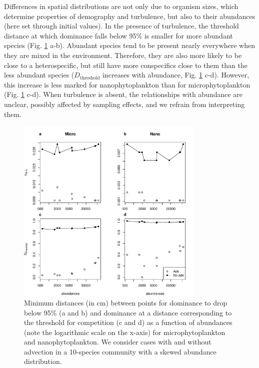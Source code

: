 \documentclass[english]{article}
\begin{document}
Differences in spatial distributions are not only due to organism
sizes, which determine properties of demography and turbulence, but
also to their abundances (here set through initial values). In the
presence of turbulence, the threshold distance at which dominance
falls below 95\% is smaller for more abundant species (Fig. \ref{fig:Carac_10sp}
a-b). Abundant species tend to be present nearly everywhere when they
are mixed in the environment. Therefore, they are also more likely
to be close to a heterospecific, but still have more conspecifics
close to them than the less abundant species ($D_{\text{threshold}}$
increases with abundance, Fig. \ref{fig:Carac_10sp} c-d). However,
this increase is less marked for nanophytoplankton than for microphytoplankton
(Fig. \ref{fig:Carac_10sp} c-d). When turbulence is absent, the relationships
with abundance are unclear, possibly affected by sampling effects,
and we refrain from interpreting them.

\begin{figure}[H]
\begin{centering}
\includegraphics[width=0.8\textwidth]{../code/figure/carac_10species}
\par\end{centering}
\caption{Minimum distances (in cm) between points for dominance to drop below
95\% (a and b) and dominance at a distance corresponding to the threshold
for competition (c and d) as a function of abundances (note the logarithmic
scale on the x-axis) for microphytoplankton and nanophytoplankton.
We consider cases with and without advection in a 10-species community
with a skewed abundance distribution. \label{fig:Carac_10sp}}
\end{figure}
\end{document}
